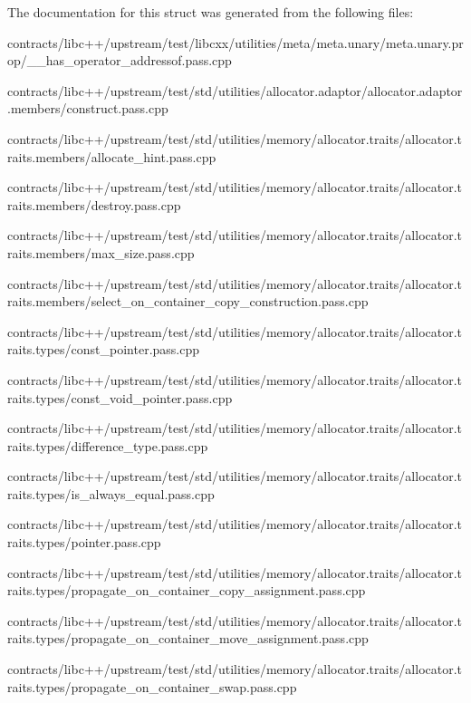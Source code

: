 The documentation for this struct was generated from the following files\+:\begin{DoxyCompactItemize}
\item 
contracts/libc++/upstream/test/libcxx/utilities/meta/meta.\+unary/meta.\+unary.\+prop/\+\_\+\+\_\+has\+\_\+operator\+\_\+addressof.\+pass.\+cpp\item 
contracts/libc++/upstream/test/std/utilities/allocator.\+adaptor/allocator.\+adaptor.\+members/construct.\+pass.\+cpp\item 
contracts/libc++/upstream/test/std/utilities/memory/allocator.\+traits/allocator.\+traits.\+members/allocate\+\_\+hint.\+pass.\+cpp\item 
contracts/libc++/upstream/test/std/utilities/memory/allocator.\+traits/allocator.\+traits.\+members/destroy.\+pass.\+cpp\item 
contracts/libc++/upstream/test/std/utilities/memory/allocator.\+traits/allocator.\+traits.\+members/max\+\_\+size.\+pass.\+cpp\item 
contracts/libc++/upstream/test/std/utilities/memory/allocator.\+traits/allocator.\+traits.\+members/select\+\_\+on\+\_\+container\+\_\+copy\+\_\+construction.\+pass.\+cpp\item 
contracts/libc++/upstream/test/std/utilities/memory/allocator.\+traits/allocator.\+traits.\+types/const\+\_\+pointer.\+pass.\+cpp\item 
contracts/libc++/upstream/test/std/utilities/memory/allocator.\+traits/allocator.\+traits.\+types/const\+\_\+void\+\_\+pointer.\+pass.\+cpp\item 
contracts/libc++/upstream/test/std/utilities/memory/allocator.\+traits/allocator.\+traits.\+types/difference\+\_\+type.\+pass.\+cpp\item 
contracts/libc++/upstream/test/std/utilities/memory/allocator.\+traits/allocator.\+traits.\+types/is\+\_\+always\+\_\+equal.\+pass.\+cpp\item 
contracts/libc++/upstream/test/std/utilities/memory/allocator.\+traits/allocator.\+traits.\+types/pointer.\+pass.\+cpp\item 
contracts/libc++/upstream/test/std/utilities/memory/allocator.\+traits/allocator.\+traits.\+types/propagate\+\_\+on\+\_\+container\+\_\+copy\+\_\+assignment.\+pass.\+cpp\item 
contracts/libc++/upstream/test/std/utilities/memory/allocator.\+traits/allocator.\+traits.\+types/propagate\+\_\+on\+\_\+container\+\_\+move\+\_\+assignment.\+pass.\+cpp\item 
contracts/libc++/upstream/test/std/utilities/memory/allocator.\+traits/allocator.\+traits.\+types/propagate\+\_\+on\+\_\+container\+\_\+swap.\+pass.\+cpp\item 

\end{DoxyCompactItemize}
